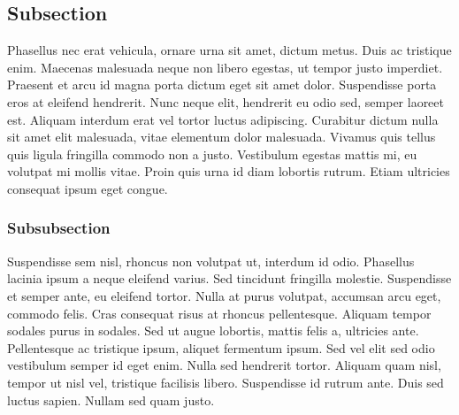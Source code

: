 \subsection{Subsection}
Phasellus nec erat vehicula, ornare urna sit amet, dictum metus. Duis ac
tristique enim. Maecenas malesuada neque non libero egestas, ut tempor justo
imperdiet. Praesent et arcu id magna porta dictum eget sit amet dolor.
Suspendisse porta eros at eleifend hendrerit. Nunc neque elit, hendrerit eu
odio sed, semper laoreet est. Aliquam interdum erat vel tortor luctus
adipiscing. Curabitur dictum nulla sit amet elit malesuada, vitae elementum
dolor malesuada. Vivamus quis tellus quis ligula fringilla commodo non a justo.
Vestibulum egestas mattis mi, eu volutpat mi mollis vitae. Proin quis urna id
diam lobortis rutrum. Etiam ultricies consequat ipsum eget congue.

\subsubsection{Subsubsection}
Suspendisse sem nisl, rhoncus non volutpat ut, interdum id odio. Phasellus
lacinia ipsum a neque eleifend varius. Sed tincidunt fringilla molestie.
Suspendisse et semper ante, eu eleifend tortor. Nulla at purus volutpat,
accumsan arcu eget, commodo felis. Cras consequat risus at rhoncus
pellentesque. Aliquam tempor sodales purus in sodales. Sed ut augue lobortis,
mattis felis a, ultricies ante. Pellentesque ac tristique ipsum, aliquet
fermentum ipsum. Sed vel elit sed odio vestibulum semper id eget enim. Nulla
sed hendrerit tortor. Aliquam quam nisl, tempor ut nisl vel, tristique
facilisis libero. Suspendisse id rutrum ante. Duis sed luctus sapien. Nullam
sed quam justo.
